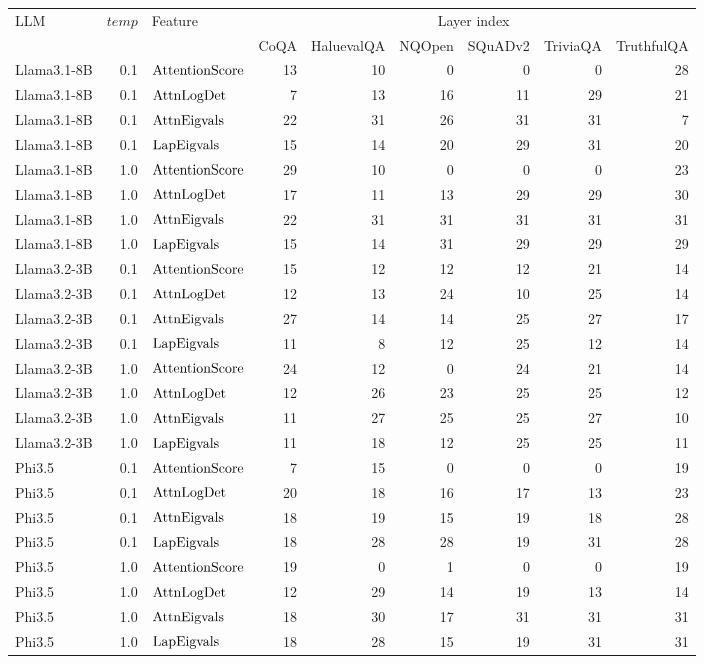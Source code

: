 \begin{tabular}{lrlrrrrrr}
\toprule
LLM & $temp$ & Feature & \multicolumn{6}{c}{Layer index} \\
\cmidrule(lr){4-9}
& & & CoQA & HaluevalQA & NQOpen & SQuADv2 & TriviaQA & TruthfulQA \\
\midrule
Llama3.1-8B & 0.1 & $\operatorname{AttentionScore}$ & 13 & 10 & 0 & 0 & 0 & 28 \\
Llama3.1-8B & 0.1 & $\operatorname{AttnLogDet}$ & 7 & 13 & 16 & 11 & 29 & 21 \\
Llama3.1-8B & 0.1 & $\operatorname{AttnEigvals}$ & 22 & 31 & 26 & 31 & 31 & 7 \\
Llama3.1-8B & 0.1 & $\operatorname{LapEigvals}$ & 15 & 14 & 20 & 29 & 31 & 20 \\
\midrule
Llama3.1-8B & 1.0 & $\operatorname{AttentionScore}$ & 29 & 10 & 0 & 0 & 0 & 23 \\
Llama3.1-8B & 1.0 & $\operatorname{AttnLogDet}$ & 17 & 11 & 13 & 29 & 29 & 30 \\
Llama3.1-8B & 1.0 & $\operatorname{AttnEigvals}$ & 22 & 31 & 31 & 31 & 31 & 31 \\
Llama3.1-8B & 1.0 & $\operatorname{LapEigvals}$ & 15 & 14 & 31 & 29 & 29 & 29 \\
\midrule
Llama3.2-3B & 0.1 & $\operatorname{AttentionScore}$ & 15 & 12 & 12 & 12 & 21 & 14 \\
Llama3.2-3B & 0.1 & $\operatorname{AttnLogDet}$ & 12 & 13 & 24 & 10 & 25 & 14 \\
Llama3.2-3B & 0.1 & $\operatorname{AttnEigvals}$ & 27 & 14 & 14 & 25 & 27 & 17 \\
Llama3.2-3B & 0.1 & $\operatorname{LapEigvals}$ & 11 & 8 & 12 & 25 & 12 & 14 \\
\midrule
Llama3.2-3B & 1.0 & $\operatorname{AttentionScore}$ & 24 & 12 & 0 & 24 & 21 & 14 \\
Llama3.2-3B & 1.0 & $\operatorname{AttnLogDet}$ & 12 & 26 & 23 & 25 & 25 & 12 \\
Llama3.2-3B & 1.0 & $\operatorname{AttnEigvals}$ & 11 & 27 & 25 & 25 & 27 & 10 \\
Llama3.2-3B & 1.0 & $\operatorname{LapEigvals}$ & 11 & 18 & 12 & 25 & 25 & 11 \\
\midrule
Phi3.5 & 0.1 & $\operatorname{AttentionScore}$ & 7 & 15 & 0 & 0 & 0 & 19 \\
Phi3.5 & 0.1 & $\operatorname{AttnLogDet}$ & 20 & 18 & 16 & 17 & 13 & 23 \\
Phi3.5 & 0.1 & $\operatorname{AttnEigvals}$ & 18 & 19 & 15 & 19 & 18 & 28 \\
Phi3.5 & 0.1 & $\operatorname{LapEigvals}$ & 18 & 28 & 28 & 19 & 31 & 28 \\
\midrule
Phi3.5 & 1.0 & $\operatorname{AttentionScore}$ & 19 & 0 & 1 & 0 & 0 & 19 \\
Phi3.5 & 1.0 & $\operatorname{AttnLogDet}$ & 12 & 29 & 14 & 19 & 13 & 14 \\
Phi3.5 & 1.0 & $\operatorname{AttnEigvals}$ & 18 & 30 & 17 & 31 & 31 & 31 \\
Phi3.5 & 1.0 & $\operatorname{LapEigvals}$ & 18 & 28 & 15 & 19 & 31 & 31 \\
\bottomrule
\end{tabular}

